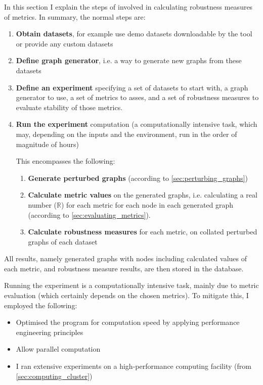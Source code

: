 In this section I explain the steps of \graffs involved in calculating robustness measures of metrics.
In summary, the normal steps are:
\begin{enumerate}
    \item \textbf{Obtain datasets}, for example use demo datasets downloadable by the \graffs tool or provide any custom datasets
    \item \textbf{Define graph generator}, i.e. a way to generate new graphs from these datasets
    \item \textbf{Define an experiment} specifying a set of datasets to start with, a graph generator to use, a set of metrics to asses, and a set of robustness measures to evaluate stability of those metrics.
    \item \textbf{Run the experiment} computation (a computationally intensive task, which may, depending on the inputs and the environment, run in the order of magnitude of hours)

    This encompasses the following:
    \begin{enumerate}[label=\alph*.]
        \item \textbf{Generate perturbed graphs} (according to \autoref{sec:perturbing_graphs})
        \item \textbf{Calculate metric values} on the generated graphs, i.e. calculating a real number ($\mathbb{R}$) for each metric for each node in each generated graph (according to \autoref{sec:evaluating_metrics}).
        \item \textbf{Calculate robustness measures} for each metric, on collated perturbed graphs of each dataset
    \end{enumerate}
\end{enumerate}

All results, namely generated graphs with nodes including calculated values of each metric, and robustness measure results, are then stored in the database.



Running the experiment is a computationally intensive task, mainly due to metric evaluation (which certainly depends on the chosen metrics).
To mitigate this, I employed the following:
\begin{itemize}[topsep=5pt]
    \item Optimised the program for computation speed by applying performance engineering principles 
    \item Allow parallel computation
    \item I ran extensive experiments on a high-performance computing facility (from \autoref{sec:computing_cluster})
\end{itemize}

